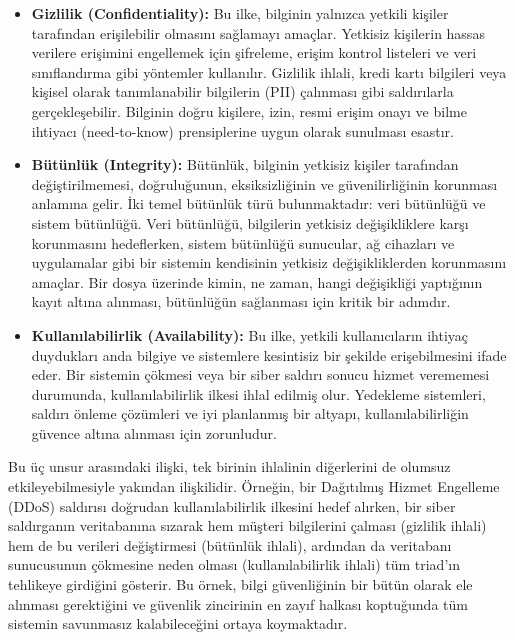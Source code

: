 \begin{itemize}
    \item \textbf{Gizlilik (Confidentiality):} Bu ilke, bilginin yalnızca yetkili kişiler tarafından erişilebilir olmasını sağlamayı amaçlar. Yetkisiz kişilerin hassas verilere erişimini engellemek için şifreleme, erişim kontrol listeleri ve veri sınıflandırma gibi yöntemler kullanılır. Gizlilik ihlali, kredi kartı bilgileri veya kişisel olarak tanımlanabilir bilgilerin (PII) çalınması gibi saldırılarla gerçekleşebilir. Bilginin doğru kişilere, izin, resmi erişim onayı ve bilme ihtiyacı (need-to-know) prensiplerine uygun olarak sunulması esastır.
    \item \textbf{Bütünlük (Integrity):} Bütünlük, bilginin yetkisiz kişiler tarafından değiştirilmemesi, doğruluğunun, eksiksizliğinin ve güvenilirliğinin korunması anlamına gelir. İki temel bütünlük türü bulunmaktadır: veri bütünlüğü ve sistem bütünlüğü. Veri bütünlüğü, bilgilerin yetkisiz değişikliklere karşı korunmasını hedeflerken, sistem bütünlüğü sunucular, ağ cihazları ve uygulamalar gibi bir sistemin kendisinin yetkisiz değişikliklerden korunmasını amaçlar. Bir dosya üzerinde kimin, ne zaman, hangi değişikliği yaptığının kayıt altına alınması, bütünlüğün sağlanması için kritik bir adımdır.
    \item \textbf{Kullanılabilirlik (Availability):} Bu ilke, yetkili kullanıcıların ihtiyaç duydukları anda bilgiye ve sistemlere kesintisiz bir şekilde erişebilmesini ifade eder. Bir sistemin çökmesi veya bir siber saldırı sonucu hizmet verememesi durumunda, kullanılabilirlik ilkesi ihlal edilmiş olur. Yedekleme sistemleri, saldırı önleme çözümleri ve iyi planlanmış bir altyapı, kullanılabilirliğin güvence altına alınması için zorunludur.
\end{itemize}

Bu üç unsur arasındaki ilişki, tek birinin ihlalinin diğerlerini de olumsuz etkileyebilmesiyle yakından ilişkilidir. Örneğin, bir Dağıtılmış Hizmet Engelleme (DDoS) saldırısı doğrudan kullanılabilirlik ilkesini hedef alırken, bir siber saldırganın veritabanına sızarak hem müşteri bilgilerini çalması (gizlilik ihlali) hem de bu verileri değiştirmesi (bütünlük ihlali), ardından da veritabanı sunucusunun çökmesine neden olması (kullanılabilirlik ihlali) tüm triad'ın tehlikeye girdiğini gösterir. Bu örnek, bilgi güvenliğinin bir bütün olarak ele alınması gerektiğini ve güvenlik zincirinin en zayıf halkası koptuğunda tüm sistemin savunmasız kalabileceğini ortaya koymaktadır.

